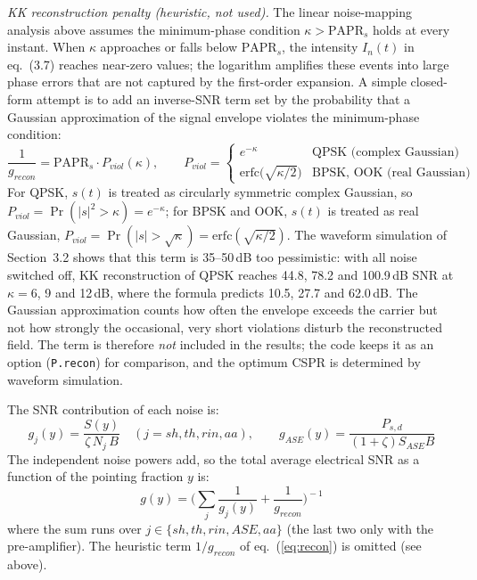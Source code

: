 \emph{KK reconstruction penalty (heuristic, not used).} The linear noise-mapping analysis above assumes the minimum-phase condition $\kappa>\mathrm{PAPR}_s$ holds at every instant. When $\kappa$ approaches or falls below $\mathrm{PAPR}_s$, the intensity $I_n(t)$ in eq.~(3.7) reaches near-zero values; the logarithm amplifies these events into large phase errors that are not captured by the first-order expansion. A simple closed-form attempt is to add an inverse-SNR term set by the probability that a Gaussian approximation of the signal envelope violates the minimum-phase condition:
\begin{equation}\label{eq:recon}
\frac{1}{g_{recon}}=\mathrm{PAPR}_s\cdot P_{viol}(\kappa),\qquad P_{viol}=\begin{cases}e^{-\kappa}&\text{QPSK (complex Gaussian)}\\[4pt]\mathrm{erfc}\!\big(\!\sqrt{\kappa/2}\big)&\text{BPSK, OOK (real Gaussian)}\end{cases}
\end{equation}
For QPSK, $s(t)$ is treated as circularly symmetric complex Gaussian, so $P_{viol}=\Pr(|s|^2>\kappa)=e^{-\kappa}$; for BPSK and OOK, $s(t)$ is treated as real Gaussian, $P_{viol}=\Pr(|s|>\sqrt\kappa)=\mathrm{erfc}(\sqrt{\kappa/2})$. The waveform simulation of Section~3.2 shows that this term is 35--50\,dB too pessimistic: with all noise switched off, KK reconstruction of QPSK reaches 44.8, 78.2 and 100.9\,dB SNR at $\kappa=6$, 9 and 12\,dB, where the formula predicts 10.5, 27.7 and 62.0\,dB. The Gaussian approximation counts how often the envelope exceeds the carrier but not how strongly the occasional, very short violations disturb the reconstructed field. The term is therefore \emph{not} included in the results; the code keeps it as an option (\texttt{P.recon}) for comparison, and the optimum CSPR is determined by waveform simulation.

The SNR contribution of each noise is:
\begin{equation}
g_j(y)=\frac{S(y)}{\zeta\,N_j\,B}\quad(j=sh,th,rin,aa),\qquad g_{ASE}(y)=\frac{P_{s,d}}{(1+\zeta)S_{ASE}B}
\end{equation}
The independent noise powers add, so the total average electrical SNR as a function of the pointing fraction $y$ is:
\begin{equation}
g(y)=\bigg(\sum_j\frac{1}{g_j(y)}+\frac{1}{g_{recon}}\bigg)^{\!-1}
\end{equation}
where the sum runs over $j\in\{sh,th,rin,ASE,aa\}$ (the last two only with the pre-amplifier). The heuristic term $1/g_{recon}$ of eq.~(\ref{eq:recon}) is omitted (see above).

